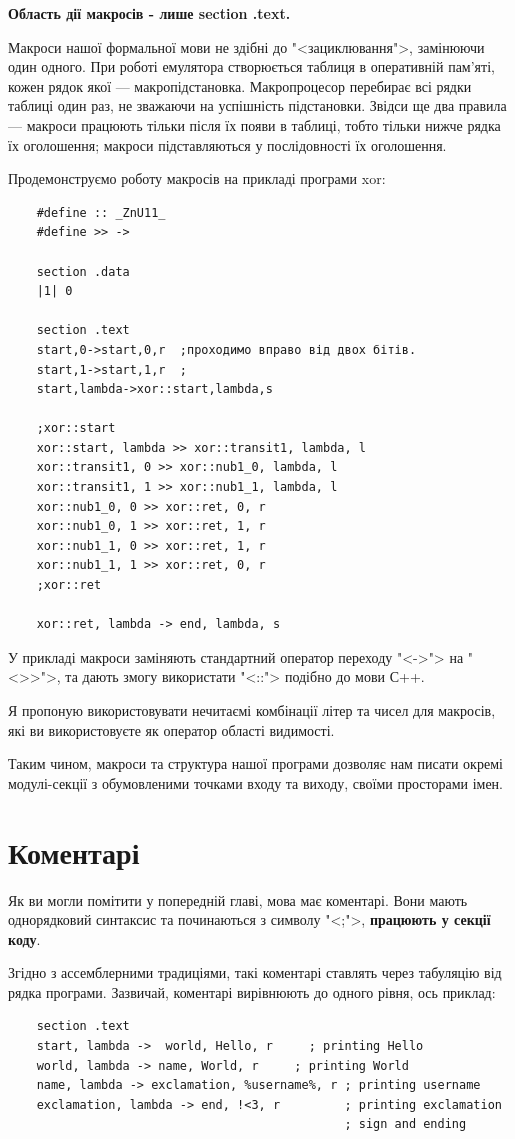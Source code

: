\documentclass[oneside,final,14pt]{extreport}
\begin{document}
{\bfseries		
Область дії макросів - лише section .text. 

Макроси нашої формальної мови не здібні до "<зациклювання">, замінюючи один одного. При роботі емулятора створюється таблиця в оперативній пам'яті, кожен рядок якої --- макропідстановка. Макропроцесор перебирає всі рядки таблиці один раз, не зважаючи на успішність підстановки. Звідси ще два правила --- макроси працюють тільки після їх появи в таблиці, тобто тільки нижче рядка їх оголошення; макроси підставляються у послідовності їх оголошення.
}

Продемонструємо роботу макросів на прикладі програми xor:	
\begin{verbatim}
	#define :: _ZnU11_
	#define >> ->

	section .data
	|1| 0

	section .text
	start,0->start,0,r	;проходимо вправо від двох бітів.
	start,1->start,1,r	;
	start,lambda->xor::start,lambda,s

	;xor::start
	xor::start, lambda >> xor::transit1, lambda, l 
	xor::transit1, 0 >> xor::nub1_0, lambda, l
	xor::transit1, 1 >> xor::nub1_1, lambda, l
	xor::nub1_0, 0 >> xor::ret, 0, r
	xor::nub1_0, 1 >> xor::ret, 1, r
	xor::nub1_1, 0 >> xor::ret, 1, r
	xor::nub1_1, 1 >> xor::ret, 0, r 
	;xor::ret

	xor::ret, lambda -> end, lambda, s
\end{verbatim}
У прикладі макроси заміняють стандартний оператор переходу "<->"> на "<>{}>">, та дають змогу використати "<::"> подібно до мови С++.
		
Я пропоную використовувати нечитаємі комбінації літер та чисел для макросів, які ви використовуєте як оператор області видимості.
		
Таким чином, макроси та структура нашої програми дозволяє нам писати окремі модулі-секції з обумовленими точками входу та виходу, своїми просторами імен.
\section{Коментарі}

Як ви могли помітити у попередній главі, мова має коментарі. Вони мають однорядковий синтаксис та починаються з символу "<;">, {\bfseries працюють у секції коду}.

Згідно з ассемблерними традиціями, такі коментарі ставлять через табуляцію від рядка програми. Зазвичай, коментарі вирівнюють до одного рівня, ось приклад:

\begin{Verbatim}
	section .text
	start, lambda ->  world, Hello, r	  ; printing Hello
	world, lambda -> name, World, r	    ; printing World
	name, lambda -> exclamation, %username%, r ; printing username
	exclamation, lambda -> end, !<3, r         ; printing exclamation
	                                           ; sign and ending
\end{Verbatim}
\end{document}
